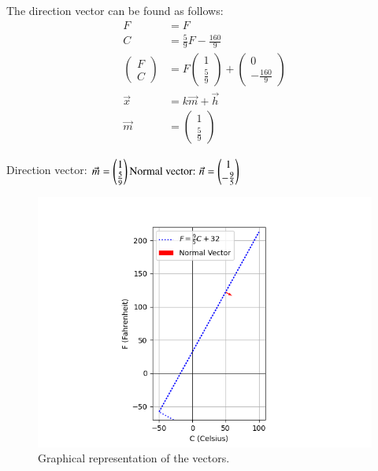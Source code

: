 \documentclass[journal]{IEEEtran}
\begin{document}
The direction vector can be found as follows:
\begin{align}
    F &= F \\
    C &= \frac{5}{9}F - \frac{160}{9} \\
    \begin{pmatrix} F \\ C \end{pmatrix} &= F \begin{pmatrix} 1 \\ \frac{5}{9} \end{pmatrix} + \begin{pmatrix} 0 \\ -\frac{160}{9} \end{pmatrix} \\
    \vec{x} &= k \vec{m} + \vec{h} \\
    \vec{m} &= \begin{pmatrix} 1 \\ \frac{5}{9} \end{pmatrix}
\end{align}

Direction vector: \( \vec{m} = \begin{pmatrix} 1 \\ \frac{5}{9} \end{pmatrix} \\
\text{Normal vector: } \vec{n} = \begin{pmatrix} 1 \\ -\frac{9}{5} \end{pmatrix} \)

\begin{figure}[h!]
    \centering
    \includegraphics[width = 1\linewidth]{figs/fig.png}
    \caption{Graphical representation of the vectors.}
    \label{stemplot}
\end{figure}
\end{document}
